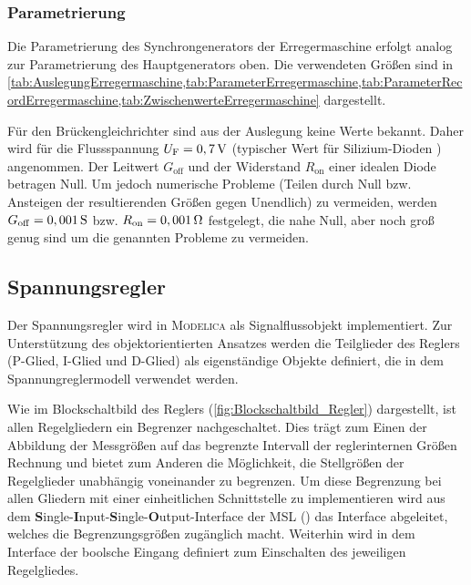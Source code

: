 
\hypertarget{parametrierung-2}{%
\subsubsection{Parametrierung}\label{parametrierung-2}}

Die Parametrierung des Synchrongenerators der Erregermaschine erfolgt
analog zur Parametrierung des Hauptgenerators oben. Die verwendeten
Größen sind in  \cref{tab:AuslegungErregermaschine,tab:ParameterErregermaschine,tab:ParameterRecordErregermaschine,tab:ZwischenwerteErregermaschine} dargestellt.

Für den Brückengleichrichter sind aus der Auslegung keine Werte bekannt. Daher wird für die Flussspannung \(U_{\mathrm{F}}=\unit[0,7]{V}\) (typischer Wert für Silizium-Dioden \cite{??} ) angenommen. Der Leitwert \(G_{\mathrm{off}}\) und der Widerstand \(R_{\mathrm{on}}\) einer idealen Diode betragen Null. Um jedoch numerische Probleme (Teilen durch Null bzw. Ansteigen der resultierenden Größen gegen Unendlich) zu vermeiden, werden \(G_{\mathrm{off}}=\unit[0,001]{S}\) bzw. \(R_{\mathrm{on}}=\unit[0,001]{\Omega}\) festgelegt, die nahe Null, aber noch groß genug sind um die genannten Probleme zu vermeiden.

\subsection{Spannungsregler}\label{sec:Spannungsregler}
Der Spannungsregler wird in \textsc{Modelica} als Signalflussobjekt implementiert. Zur Unterstützung des objektorientierten Ansatzes werden die Teilglieder des Reglers (P-Glied, I-Glied und D-Glied) als eigenständige Objekte definiert, die in dem Spannungreglermodell verwendet werden.

Wie im Blockschaltbild des Reglers (\cref{fig:Blockschaltbild_Regler}) dargestellt, ist allen Regelgliedern ein Begrenzer nachgeschaltet. Dies trägt zum Einen der Abbildung der Messgrößen auf das begrenzte Intervall der reglerinternen Größen Rechnung und bietet zum Anderen die Möglichkeit, die Stellgrößen der Regelglieder unabhängig voneinander zu begrenzen. Um diese Begrenzung bei allen Gliedern mit einer einheitlichen Schnittstelle zu implementieren wird aus dem \textbf{S}ingle-\textbf{I}nput-\textbf{S}ingle-\textbf{O}utput-Interface der MSL () das Interface  abgeleitet, welches die Begrenzungsgrößen zugänglich macht. Weiterhin wird in dem Interface der boolsche Eingang  definiert zum Einschalten des jeweiligen Regelgliedes.­

